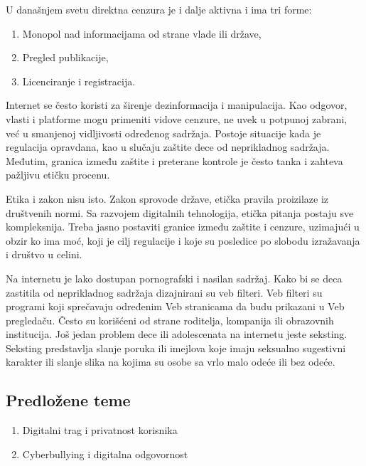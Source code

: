 \documentclass[12pt]{article}
\begin{document}
U današnjem svetu direktna cenzura je i dalje aktivna i ima tri forme:
\begin{enumerate}
  \item Monopol nad informacijama od strane vlade ili države,
  \item Pregled publikacije,
  \item Licenciranje i registracija.
\end{enumerate}


Internet se često koristi za širenje dezinformacija i manipulacija. Kao odgovor, vlasti i platforme mogu primeniti vidove cenzure, ne uvek u potpunoj zabrani, već u smanjenoj vidljivosti određenog sadržaja. Postoje situacije kada je regulacija opravdana, kao u slučaju zaštite dece od neprikladnog sadržaja. Međutim, granica između zaštite i preterane kontrole je često tanka i zahteva pažljivu etičku procenu.


Etika i zakon nisu isto. Zakon sprovode države, etička pravila proizilaze iz društvenih normi. Sa razvojem digitalnih tehnologija, etička pitanja postaju sve kompleksnija. Treba jasno postaviti granice između zaštite i cenzure, uzimajući u obzir ko ima moć, koji je cilj regulacije i koje su posledice po slobodu izražavanja i društvo u celini.

Na internetu je lako dostupan pornografski i nasilan sadržaj. Kako bi se deca zastitila od neprikladnog sadržaja dizajnirani su veb filteri. Veb filteri su programi koji sprečavaju određenim Veb stranicama da budu prikazani u Veb pregledaču. Često su korišćeni od strane roditelja, kompanija ili obrazovnih institucija.
Još jedan problem dece ili adolescenata na internetu jeste seksting. Seksting predstavlja slanje poruka ili imejlova koje imaju seksualno sugestivni karakter ili slanje slika na kojima su osobe sa vrlo malo odeće ili bez odeće.

\subsection{Predložene teme}
\begin{enumerate}
    \item Digitalni trag i privatnost korisnika
    \item Cyberbullying i digitalna odgovornost
\end{enumerate}
\end{document}
